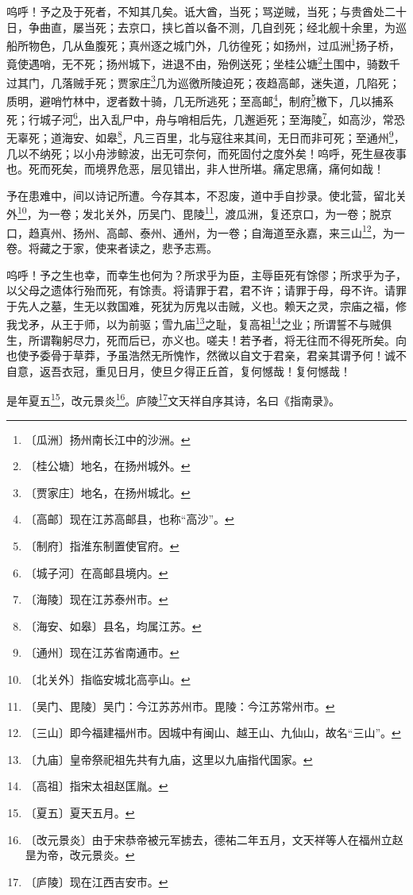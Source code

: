 \documentclass[12pt,UTF-8,openany,a4]{ctexbook}
\begin{document}
\begin{large}
    呜呼！予之及于死者，不知其几矣。诋大酋，当死；骂逆贼，当死；与贵酋处二十日，争曲直，屡当死；去京口，挟匕首以备不测，几自刭死；经北舰十余里，为巡船所物色，几从鱼腹死；真州逐之城门外，几彷徨死；如扬州，过瓜洲\footnote{〔瓜洲〕\yiwen 扬州南长江中的沙洲。}扬子桥，竟使遇哨，无不死；扬州城下，进退不由，殆例送死；坐桂公塘\footnote{〔桂公塘〕\yiwen 地名，在扬州城外。}土围中，骑数千过其门，几落贼手死；贾家庄\footnote{〔贾家庄〕\yiwen 地名，在扬州城北。}几为巡徼所陵迫死；夜趋高邮，迷失道，几陷死；质明，避哨竹林中，逻者数十骑，几无所逃死；至高邮\footnote{〔高邮〕\yiwen 现在江苏高邮县，也称“高沙”。}，制府\footnote{〔制府〕\yiwen 指淮东制置使官府。}檄下，几以捕系死；行城子河\footnote{〔城子河〕\yiwen 在高邮县境内。}，出入乱尸中，舟与哨相后先，几邂逅死；至海陵\footnote{〔海陵〕\yiwen 现在江苏泰州市。}，如高沙，常恐无辜死；道海安、如皋\footnote{〔海安、如皋〕\yiwen 县名，均属江苏。}，凡三百里，北与寇往来其间，无日而非可死；至通州\footnote{〔通州〕\yiwen 现在江苏省南通市。}，几以不纳死；以小舟涉鲸波，出无可奈何，而死固付之度外矣！呜呼，死生昼夜事也。死而死矣，而境界危恶，层见错出，非人世所堪。痛定思痛，痛何如哉！
    
    予在患难中，间以诗记所遭。今存其本，不忍废，道中手自抄录。使北营，留北关外\footnote{〔北关外〕\yiwen 指临安城北高亭山。}，为一卷；发北关外，历吴门、毘陵\footnote{〔吴门、毘陵〕\yiwen 吴门：今江苏苏州市。毘陵：今江苏常州市。}，渡瓜洲，复还京口，为一卷；脱京口，趋真州、扬州、高邮、泰州、通州，为一卷；自海道至永嘉，来三山\footnote{〔三山〕\yiwen 即今福建福州市。因城中有闽山、越王山、九仙山，故名“三山”。}，为一卷。将藏之于家，使来者读之，悲予志焉。
    
    呜呼！予之生也幸，而幸生也何为？所求乎为臣，主辱臣死有馀僇；所求乎为子，以父母之遗体行殆而死，有馀责。将请罪于君，君不许；请罪于母，母不许。请罪于先人之墓，生无以救国难，死犹为厉鬼以击贼，义也。赖天之灵，宗庙之福，修我戈矛，从王于师，以为前驱；雪九庙\footnote{〔九庙〕\yiwen 皇帝祭祀祖先共有九庙，这里以九庙指代国家。}之耻，复高祖\footnote{〔高祖〕\yiwen 指宋太祖赵匡胤。}之业；所谓誓不与贼俱生，所谓鞠躬尽力，死而后已，亦义也。嗟夫！若予者，将无往而不得死所矣。向也使予委骨于草莽，予虽浩然无所愧怍，然微以自文于君亲，君亲其谓予何！诚不自意，返吾衣冠，重见日月，使旦夕得正丘首，复何憾哉！复何憾哉！
    
    是年夏五\footnote{〔夏五〕\yiwen 夏天五月。}，改元景炎\footnote{〔改元景炎〕\yiwen 由于宋恭帝被元军掳去，德祐二年五月，文天祥等人在福州立赵昰为帝，改元景炎。}。庐陵\footnote{〔庐陵〕\yiwen 现在江西吉安市。}文天祥自序其诗，名曰《指南录》。

\end{large}
\end{document}
